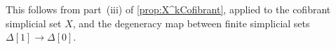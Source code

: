 \documentclass[reqno,10pt,a4paper,oneside]{amsart}
\makeatletter
\renewenvironment{proof}[1][\proofname] {\par\pushQED{\qed}\normalfont\topsep6\p@\@plus6\p@\relax\trivlist\item[\hskip\labelsep\bf#1\@addpunct{.}]\ignorespaces}{\popQED\endtrivlist\@endpefalse}
\numberwithin{equation}{section}
\theoremstyle{mythm}
\theoremstyle{mydef}
\theoremstyle{myrmk}
\newcommand{\ie}{\text{i.e.\ }}
\newcommand{\Path}{\mathsf{Path}}
\makeatother
\begin{document}
\begin{proof}
This follows from part~(iii) of \cref{prop:X^kCofibrant}, applied to the cofibrant simplicial set $X$, and the degeneracy map between finite simplicial sets $\Delta[1] \rightarrow \Delta[0]$. 
\end{proof}






\end{document}
